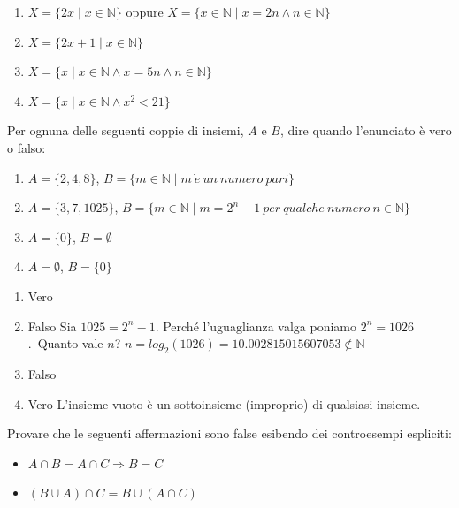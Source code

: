 \begin{soluzione}
\begin{enumerate}
    \item  $X = \{ 2x \mid x \in \mathbb{N}  \}$  
    oppure $X = \{ x \in \mathbb{N} \mid x = 2n \wedge n \in \mathbb{N}  \}$
    \item $X = \{ 2x+1 \mid x \in \mathbb{N}  \}$
    \item $X = \{ x  \mid x \in \mathbb{N} \wedge x = 5n \wedge n \in \mathbb{N} \}$ 
    \item $X = \{ x  \mid x \in \mathbb{N} \wedge x^2 < 21 \}$
\end{enumerate}
\end{soluzione}


\begin{esercizio}
Per ognuna delle seguenti coppie di insiemi, $A$ e $B$, dire quando l'enunciato  è vero o falso:
\begin{enumerate}
    \item $A = \{ 2,4,8 \}$, $B = \{ m \in \mathbb{N} \mid m \ \grave{e} \ un \ numero \ pari \}$
    \item $A = \{3,7,1025 \}$,  $B = \{ m \in \mathbb{N} \mid m = 2^n -1 \ per \ qualche \ numero \ n \in \mathbb{N}\}$
    \item $A = \{ 0 \}$, $B = \emptyset$
    \item $A = \emptyset$, $B = \{ 0 \}$
\end{enumerate}    
\end{esercizio}

\begin{soluzione}
\begin{enumerate}
    \item Vero
    \item Falso
    Sia $1025 = 2^n - 1 $. Perché l'uguaglianza valga poniamo $2^n = 1026$.\ 
    Quanto vale $n$? $n = log_2 (1026) = 10.002815015607053 \not\in \mathbb{N}$ 
    \item Falso
    \item Vero 
    L'insieme vuoto è un sottoinsieme (improprio) di qualsiasi insieme.\\
\end{enumerate}
\end{soluzione}


\begin{esercizio}
Provare che le seguenti affermazioni sono false esibendo dei controesempi espliciti:
\begin{itemize}
    \item $A\cap B = A \cap C\Rightarrow B = C$
    \item $(B\cup A)\cap C = B\cup (A\cap C)$
\end{itemize}
\end{esercizio}

